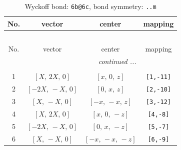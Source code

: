 \documentclass[fleqn,8pt]{jsarticle}
\begin{document}
\begin{longtable}{cccc}
\caption{Wyckoff bond: {\tt 6b@6c}, bond symmetry: {\tt ..m}}
 \\
 \hline \hline
No. & vector & center & mapping \\ \hline \endfirsthead

\multicolumn{3}{l}{\tablename\ \thetable{}} \\
 \hline \hline
No. & vector & center & mapping \\ \hline \endhead

 \hline \hline
\multicolumn{3}{r}{\footnotesize\it continued ...} \\ \endfoot

 \hline \hline
\multicolumn{3}{r}{} \\ \endlastfoot

1 & $\left[ X,\, 2 X,\, 0 \right]$ & $\left[ x,\, 0,\, z \right]$ & {\tt [1,-11]} \\ \hline
2 & $\left[ - 2 X,\, - X,\, 0 \right]$ & $\left[ 0,\, x,\, z \right]$ & {\tt [2,-10]} \\ \hline
3 & $\left[ X,\, - X,\, 0 \right]$ & $\left[ - x,\, - x,\, z \right]$ & {\tt [3,-12]} \\ \hline
4 & $\left[ X,\, 2 X,\, 0 \right]$ & $\left[ x,\, 0,\, - z \right]$ & {\tt [4,-8]} \\ \hline
5 & $\left[ - 2 X,\, - X,\, 0 \right]$ & $\left[ 0,\, x,\, - z \right]$ & {\tt [5,-7]} \\ \hline
6 & $\left[ X,\, - X,\, 0 \right]$ & $\left[ - x,\, - x,\, - z \right]$ & {\tt [6,-9]} \\
\end{longtable}
\renewcommand{\arraystretch}{1.2}
\end{document}
